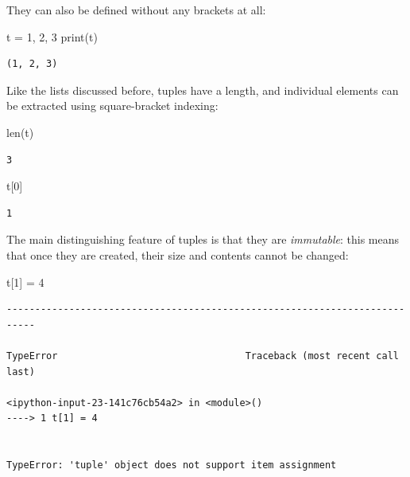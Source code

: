 \documentclass[]{article}
\newenvironment{Shaded}{}{}
\newcommand{\DecValTok}[1]{\textcolor[rgb]{0.25,0.63,0.44}{{#1}}}
\newcommand{\OperatorTok}[1]{\textcolor[rgb]{0.40,0.40,0.40}{{#1}}}
\newcommand{\BuiltInTok}[1]{{#1}}
\newcommand{\NormalTok}[1]{{#1}}
\begin{document}
They can also be defined without any brackets at all:

\begin{Shaded}
\begin{Highlighting}[]
\NormalTok{t }\OperatorTok{=} \DecValTok{1}\NormalTok{, }\DecValTok{2}\NormalTok{, }\DecValTok{3}
\BuiltInTok{print}\NormalTok{(t)}
\end{Highlighting}
\end{Shaded}

\begin{verbatim}
(1, 2, 3)
\end{verbatim}

Like the lists discussed before, tuples have a length, and individual
elements can be extracted using square-bracket indexing:

\begin{Shaded}
\begin{Highlighting}[]
\BuiltInTok{len}\NormalTok{(t)}
\end{Highlighting}
\end{Shaded}

\begin{verbatim}
3
\end{verbatim}

\begin{Shaded}
\begin{Highlighting}[]
\NormalTok{t[}\DecValTok{0}\NormalTok{]}
\end{Highlighting}
\end{Shaded}

\begin{verbatim}
1
\end{verbatim}

The main distinguishing feature of tuples is that they are
\emph{immutable}: this means that once they are created, their size and
contents cannot be changed:

\begin{Shaded}
\begin{Highlighting}[]
\NormalTok{t[}\DecValTok{1}\NormalTok{] }\OperatorTok{=} \DecValTok{4}
\end{Highlighting}
\end{Shaded}

\begin{verbatim}
---------------------------------------------------------------------------

TypeError                                 Traceback (most recent call last)

<ipython-input-23-141c76cb54a2> in <module>()
----> 1 t[1] = 4


TypeError: 'tuple' object does not support item assignment
\end{verbatim}
\end{document}
